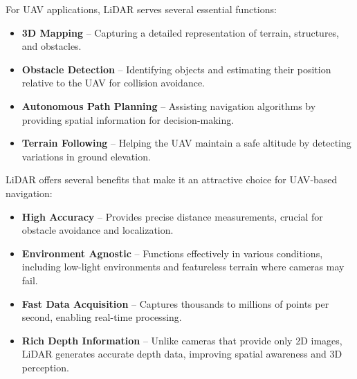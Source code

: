             For UAV applications, \ac{LiDAR} serves several essential functions:  
            \begin{itemize}  
                \item \textbf{3D Mapping} -- Capturing a detailed representation of terrain, structures, and obstacles.  
                \item \textbf{Obstacle Detection} -- Identifying objects and estimating their position relative to the \ac{UAV} for collision avoidance.  
                \item \textbf{Autonomous Path Planning} -- Assisting navigation algorithms by providing spatial information for decision-making.  
                \item \textbf{Terrain Following} -- Helping the \ac{UAV} maintain a safe altitude by detecting variations in ground elevation.  
            \end{itemize}  

            \ac{LiDAR} offers several benefits that make it an attractive choice for \ac{UAV}-based navigation:  
            \begin{itemize}  
                \item \textbf{High Accuracy} -- Provides precise distance measurements, crucial for obstacle avoidance and localization.  
                \item \textbf{Environment Agnostic} -- Functions effectively in various conditions, including low-light environments and featureless terrain where cameras may fail.  
                \item \textbf{Fast Data Acquisition} -- Captures thousands to millions of points per second, enabling real-time processing.  
                \item \textbf{Rich Depth Information} -- Unlike cameras that provide only 2D images, \ac{LiDAR} generates accurate depth data, improving spatial awareness and 3D perception.  
            \end{itemize}  

